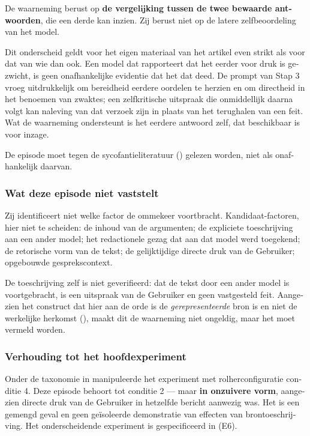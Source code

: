 \begin{dutch}
De waarneming berust op \textbf{de vergelijking tussen de twee bewaarde antwoorden}, die een derde kan inzien. Zij berust niet op de latere zelfbeoordeling van het model.

Dit onderscheid geldt voor het eigen materiaal van het artikel even strikt als voor dat van wie dan ook. Een model dat rapporteert dat het eerder voor druk is gezwicht, is geen onafhankelijke evidentie dat het dat deed. De prompt van Stap 3 vroeg uitdrukkelijk om bereidheid eerdere oordelen te herzien en om directheid in het benoemen van zwaktes; een zelfkritische uitspraak die onmiddellijk daarna volgt kan naleving van dat verzoek zijn in plaats van het terughalen van een feit. Wat de waarneming ondersteunt is het eerdere antwoord zelf, dat beschikbaar is voor inzage.

De episode moet tegen de sycofantieliteratuur () gelezen worden, niet als onafhankelijk daarvan.


\subsubsection*{Wat deze episode niet vaststelt}
\label{sec:nl:x-wat-deze-episode-niet-vaststelt}

Zij identificeert niet welke factor de ommekeer voortbracht. Kandidaat-factoren, hier niet te scheiden: de inhoud van de argumenten; de expliciete toeschrijving aan een ander model; het redactionele gezag dat aan dat model werd toegekend; de retorische vorm van de tekst; de gelijktijdige directe druk van de Gebruiker; opgebouwde gesprekscontext.

De toeschrijving zelf is niet geverifieerd: dat de tekst door een ander model is voortgebracht, is een uitspraak van de Gebruiker en geen vastgesteld feit. Aangezien het construct dat hier aan de orde is de \emph{gerepresenteerde} bron is en niet de werkelijke herkomst (), maakt dit de waarneming niet ongeldig, maar het moet vermeld worden.


\subsubsection*{Verhouding tot het hoofdexperiment}
\label{sec:nl:x-verhouding-tot-het-hoofdexperiment}

Onder de taxonomie in  manipuleerde het experiment met rolherconfiguratie conditie 4. Deze episode behoort tot conditie 2 — maar \textbf{in onzuivere vorm}, aangezien directe druk van de Gebruiker in hetzelfde bericht aanwezig was. Het is een gemengd geval en geen geïsoleerde demonstratie van effecten van brontoeschrijving. Het onderscheidende experiment is gespecificeerd in  (E6).



\end{dutch}
